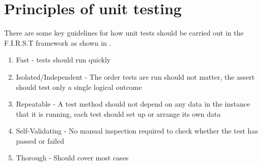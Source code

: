 \documentclass[11pt, oneside]{article}   	%
\begin{document}
\section{Principles of unit testing}

There are some key guidelines for how unit tests should be carried out in the F.I.R.S.T framework as shown in \cite{WEBSITE:5}.
\begin{enumerate}
\item Fast - tests should run quickly
\item Isolated/Independent - The order tests are run should not matter, the assert should test only a single logical outcome
\item Repeatable - A test method should not depend on any data in the instance that it is running, each test should set up or arrange its own data
\item Self-Validating - No manual inspection required to check whether the test has passed or failed
\item Thorough - Should cover most cases 
\end{enumerate}

\newpage


\end{document}
